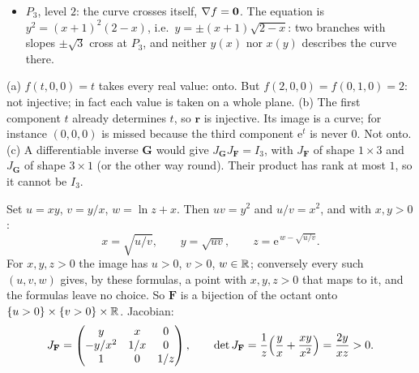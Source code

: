 \begin{solutions}
\begin{itemize}[leftmargin=1.2em,itemsep=0.2ex]
                $x=1$ except at $x=1$: the level set near $P_{2}$ is just
                $P_{2}$, and neither function exists.
          \item $P_{3}$, level $2$: the curve crosses itself,
                $\nabla f=\mathbf{0}$. The equation is
                $y^{2}=(x+1)^{2}(2-x)$, i.e.\ $y=\pm(x+1)\sqrt{2-x}$: two
                branches with slopes $\pm\sqrt3$ cross at $P_{3}$, and
                neither $y(x)$ nor $x(y)$ describes the curve there.
        \end{itemize}
  \item (a) $f(t,0,0)=t$ takes every real value: onto. But
        $f(2,0,0)=f(0,1,0)=2$: not injective; in fact each value is taken on
        a whole plane. (b) The first component $t$ already determines $t$,
        so $\mathbf{r}$ is injective. Its image is a curve; for instance
        $(0,0,0)$ is missed because the third component $\mathrm{e}^{t}$ is
        never $0$. Not onto. (c) A differentiable inverse $\mathbf{G}$ would
        give $J_{\mathbf{G}}J_{\mathbf{F}}=I_{3}$, with $J_{\mathbf{F}}$ of
        shape $1\times3$ and $J_{\mathbf{G}}$ of shape $3\times1$ (or the
        other way round). Their product has rank at most $1$, so it cannot
        be $I_{3}$.
  \item Set $u=xy$, $v=y/x$, $w=\ln z+x$. Then $uv=y^{2}$ and
        $u/v=x^{2}$, and with $x,y>0$:
        \[
          x=\sqrt{u/v},\qquad y=\sqrt{uv},\qquad
          z=\mathrm{e}^{\,w-\sqrt{u/v}} .
        \]
        For $x,y,z>0$ the image has $u>0$, $v>0$, $w\in\mathbb{R}$; conversely
        every such $(u,v,w)$ gives, by these formulas, a point with
        $x,y,z>0$ that maps to it, and the formulas leave no choice. So
        $\mathbf{F}$ is a bijection of the octant onto
        $\{u>0\}\times\{v>0\}\times\mathbb{R}$. Jacobian:
        \[
          J_{\mathbf{F}}=\begin{pmatrix}y&x&0\\-y/x^{2}&1/x&0\\1&0&1/z
          \end{pmatrix},\qquad
          \det J_{\mathbf{F}}=\frac1z\Bigl(\frac yx+\frac{xy}{x^{2}}\Bigr)
          =\frac{2y}{xz}>0 .
        \]
\end{solutions}
